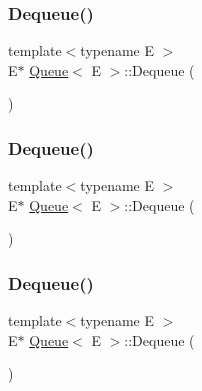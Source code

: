 \mbox{\label{class_queue_a434d465001c3078e999f7a89a8af84c0}} 
\subsubsection{\texorpdfstring{Dequeue()}{Dequeue()}\hspace{0.1cm}{\footnotesize\ttfamily [1/3]}}
{\footnotesize\ttfamily template$<$typename E $>$ \\
E$\ast$ \mbox{\hyperlink{class_queue}{Queue}}$<$ E $>$\+::Dequeue (\begin{DoxyParamCaption}{ }\end{DoxyParamCaption})\hspace{0.3cm}{\ttfamily [inline]}}

\mbox{\label{class_queue_a434d465001c3078e999f7a89a8af84c0}} 
\subsubsection{\texorpdfstring{Dequeue()}{Dequeue()}\hspace{0.1cm}{\footnotesize\ttfamily [2/3]}}
{\footnotesize\ttfamily template$<$typename E $>$ \\
E$\ast$ \mbox{\hyperlink{class_queue}{Queue}}$<$ E $>$\+::Dequeue (\begin{DoxyParamCaption}{ }\end{DoxyParamCaption})\hspace{0.3cm}{\ttfamily [inline]}}

\mbox{\label{class_queue_a434d465001c3078e999f7a89a8af84c0}} 
\subsubsection{\texorpdfstring{Dequeue()}{Dequeue()}\hspace{0.1cm}{\footnotesize\ttfamily [3/3]}}
{\footnotesize\ttfamily template$<$typename E $>$ \\
E$\ast$ \mbox{\hyperlink{class_queue}{Queue}}$<$ E $>$\+::Dequeue (\begin{DoxyParamCaption}{ }\end{DoxyParamCaption})\hspace{0.3cm}{\ttfamily [inline]}}

